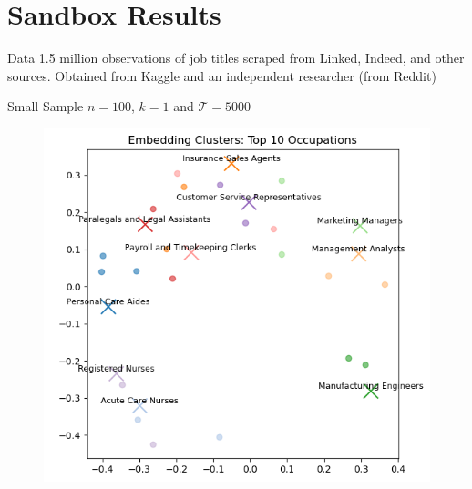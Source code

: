 \documentclass{beamer}
\newcommand\Tau{\mathcal{T}}
\begin{document}
\section{Sandbox Results}

\begin{frame}{Data}
1.5 million observations of job titles scraped from Linked, Indeed, and other sources. Obtained from Kaggle and an independent researcher (from Reddit)
\end{frame}

\begin{frame}{Small Sample $n=100$,  $k=1$ and $\Tau=5000$}
    \begin{figure}
        
        \includegraphics[width=0.6\linewidth]{images/100_small_samples.png}
        \label{fig:k1t1000}
    \end{figure}
\end{frame}
\end{document}
